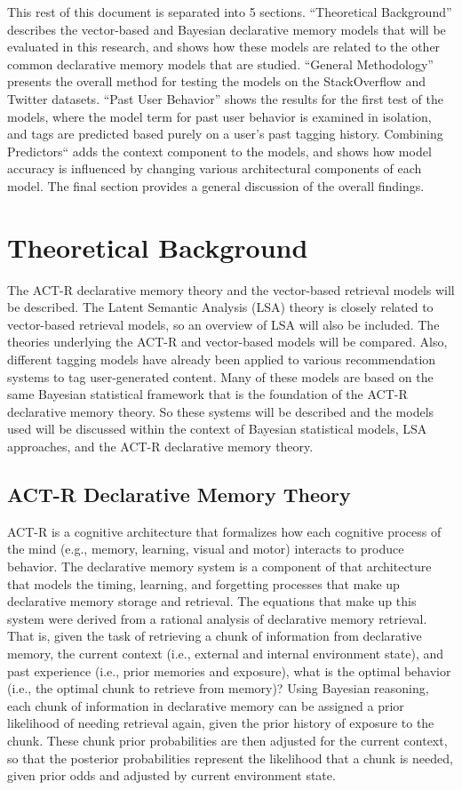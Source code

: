 \documentclass[man,donotrepeattitle]{apa6}
\begin{document}
This rest of this document is separated into 5 sections.
``Theoretical Background'' describes the vector-based and Bayesian declarative memory models that will be evaluated in this research,
and shows how these models are related to the other common declarative memory models that are studied.
``General Methodology'' presents the overall method for testing the models on the StackOverflow and Twitter datasets.
``Past User Behavior'' shows the results for the first test of the models, where the model term for past user behavior is examined in isolation, and tags are predicted based purely on a user's past tagging history.
Combining Predictors`` adds the context component to the models, and shows how model accuracy is influenced by changing various architectural components of each model.
The final section provides a general discussion of the overall findings.

\section{Theoretical Background}

The ACT-R declarative memory theory and the vector-based retrieval models will be described.
The Latent Semantic Analysis (LSA) theory is closely related to vector-based retrieval models, so an overview of LSA will also be included.
The theories underlying the ACT-R and vector-based models will be compared.
Also, different tagging models have already been applied to various recommendation systems to tag user-generated content.
Many of these models are based on the same Bayesian statistical framework that is the foundation of the ACT-R declarative memory theory.
So these systems will be described and the models used will be discussed within the context of Bayesian statistical models, LSA approaches, and the ACT-R declarative memory theory. 

\subsection{ACT-R Declarative Memory Theory}

ACT-R \parencite{Anderson2007} is a cognitive architecture that formalizes how each cognitive process of the mind (e.g., memory, learning, visual and motor) interacts to produce behavior.
The declarative memory system is a component of that architecture that models the timing, learning, and forgetting processes that make up declarative memory storage and retrieval.
The equations that make up this system were derived from a rational analysis of declarative memory retrieval.
That is, given the task of retrieving a chunk of information from declarative memory,
the current context (i.e., external and internal environment state), and past experience (i.e., prior memories and exposure), 
what is the optimal behavior (i.e., the optimal chunk to retrieve from memory)?
Using Bayesian reasoning, each chunk of information in declarative memory can be assigned a prior likelihood of needing retrieval again, given the prior history of exposure to the chunk.
These chunk prior probabilities are then adjusted for the current context, so that the posterior probabilities represent the likelihood that a chunk is needed, given prior odds and adjusted by current environment state.
\end{document}

